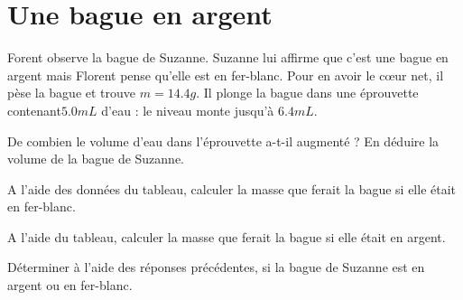 \section{Une bague en argent}\label{ex:bague}

Forent observe la bague de Suzanne. Suzanne lui affirme que c'est une bague en argent mais Florent pense qu'elle est en fer-blanc. Pour en avoir le c\oe ur net, il pèse la bague et trouve $m = \num{14.4} g$. Il plonge la bague dans une éprouvette contenant$ \num{5.0} mL$ d'eau : le niveau monte jusqu'à $\num{6.4} mL$.  

\begin{questions}
	\question De combien le volume d'eau dans l'éprouvette a-t-il augmenté ? En déduire la volume de la bague de Suzanne.
	
	\question A l'aide des données du tableau, calculer la masse que ferait la bague si elle était en fer-blanc.
	
	\question A l'aide du tableau, calculer la masse que ferait la bague si elle était en argent.
	
	\question Déterminer à l'aide des réponses précédentes, si la bague de Suzanne est en argent ou en fer-blanc.

\end{questions}
